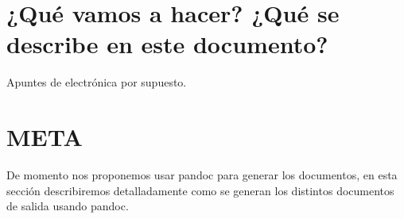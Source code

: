 \section{¿Qué vamos a hacer? ¿Qué se describe en este
documento?}\label{quuxe9-vamos-a-hacer-quuxe9-se-describe-en-este-documento}

Apuntes de electrónica por supuesto.

\section{META}\label{meta}

De momento nos proponemos usar pandoc para generar los documentos, en
esta sección describiremos detalladamente como se generan los distintos
documentos de salida usando pandoc.
